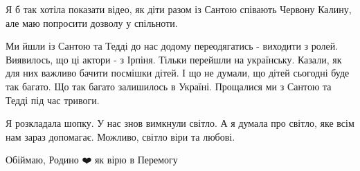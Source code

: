 Я б так хотіла показати відео, як діти разом із Сантою співають Червону Калину,
але маю попросити дозволу у спільноти. 

Ми йшли із Сантою та Тедді до нас додому переодягатись - виходити з ролей.
Виявилось, що ці актори  - з Ірпіня. Тільки перейшли на українську. Казали, як
для них важливо бачити посмішки дітей. І що не думали, що дітей сьогодні буде
так багато. Що так багато залишилось в Україні. Прощалися ми з Сантою та Тедді
під час тривоги. 

Я розкладала шопку. У нас знов вимкнули світло. А я думала про світло, яке всім
нам зараз допомагає. Можливо, світло віри та любові. 

Обіймаю, Родино ❤️ як вірю в Перемогу


